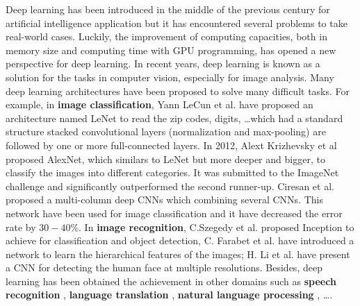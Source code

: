 \documentclass[review]{elsarticle}
\begin{document}
Deep learning \cite{lecun2015deep} has been introduced in the middle of the previous century for artificial intelligence application but it has encountered several problems to take real-world cases. Luckily, the improvement of computing capacities, both in memory size and computing time with GPU programming, has opened a new perspective for deep learning. In recent years, deep learning is known as a solution for the tasks in computer vision, especially for image analysis. Many deep learning architectures have been proposed to solve many difficult tasks. For example, in \textbf{image classification}, Yann LeCun et al. \cite{lecun1998gradient} have proposed an architecture named LeNet to read the zip codes, digits, \ldots which had a standard structure stacked convolutional layers (normalization and max-pooling) are followed by one or more full-connected layers. In 2012, Alext Krizhevsky et al \cite{krizhevsky2012imagenet} proposed AlexNet, which similars to LeNet but more deeper and bigger, to classify the images into different categories. It was submitted to the ImageNet challenge and significantly outperformed the second runner-up. Ciresan et al. \cite{ciregan2012multi} proposed a multi-column deep CNNs which combining several CNNs. This network have been used for image classification and it have decreased the error rate by $30 - 40\%$. In \textbf{image recognition}, C.Szegedy et al. \cite{szegedy2015going} proposed Inception to achieve for classification and object detection, C. Farabet et al. \cite{farabet2013learning} have introduced a network to learn the hierarchical features of the images; H. Li et al. \cite{li2015convolutional} have present a CNN for detecting the human face at multiple resolutions. Besides, deep learning has been obtained the achievement in other domains such as \textbf{speech recognition} \cite{mikolov2011strategies, hinton2012deep}, \textbf{language translation} \cite{jean2014using, sutskever2014sequence}, \textbf{natural language processing} \cite{lecun2015deep, collobert2011natural, collobert2008unified}, \ldots.
\end{document}

